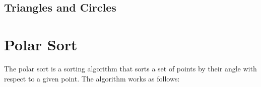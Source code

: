

\subsection{Triangles and Circles}




\section{Polar Sort}

The polar sort is a sorting algorithm that sorts a set of points by their angle with respect to a given point. The algorithm works as follows:



